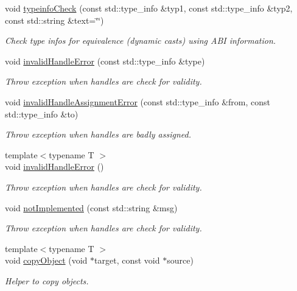 \begin{DoxyCompactItemize}
void \hyperlink{namespace_d_d4hep_ad28e7066d6a18fdd0422755c43425883}{typeinfo\+Check} (const std\+::type\+\_\+info \&typ1, const std\+::type\+\_\+info \&typ2, const std\+::string \&text=\char`\"{}\char`\"{})
\begin{DoxyCompactList}\small\item\em Check type infos for equivalence (dynamic casts) using A\+BI information. \end{DoxyCompactList}\item 
void \hyperlink{namespace_d_d4hep_abe634ec00c4fc9e3a5e722ad0865d848}{invalid\+Handle\+Error} (const std\+::type\+\_\+info \&type)
\begin{DoxyCompactList}\small\item\em Throw exception when handles are check for validity. \end{DoxyCompactList}\item 
void \hyperlink{namespace_d_d4hep_a5f946a2ebf8795b6a70037ff00ad2aab}{invalid\+Handle\+Assignment\+Error} (const std\+::type\+\_\+info \&from, const std\+::type\+\_\+info \&to)
\begin{DoxyCompactList}\small\item\em Throw exception when handles are badly assigned. \end{DoxyCompactList}\item 
{\footnotesize template$<$typename T $>$ }\\void \hyperlink{namespace_d_d4hep_ac1ec54d96148f5c3e8150944ba390d34}{invalid\+Handle\+Error} ()
\begin{DoxyCompactList}\small\item\em Throw exception when handles are check for validity. \end{DoxyCompactList}\item 
void \hyperlink{namespace_d_d4hep_a2567960a4486c9f442089e0893b84d27}{not\+Implemented} (const std\+::string \&msg)
\begin{DoxyCompactList}\small\item\em Throw exception when handles are check for validity. \end{DoxyCompactList}\item 
{\footnotesize template$<$typename T $>$ }\\void \hyperlink{namespace_d_d4hep_a75e45fd87352ce6cd4a2643db432e165}{copy\+Object} (void $\ast$target, const void $\ast$source)
\begin{DoxyCompactList}\small\item\em Helper to copy objects. \end{DoxyCompactList}\item 

\end{DoxyCompactItemize}
